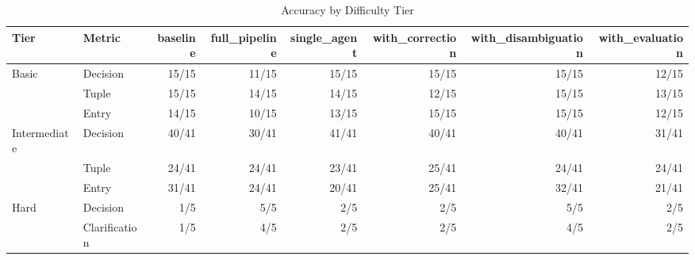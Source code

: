 \begin{table}[htbp]
\centering
\caption{Accuracy by Difficulty Tier}
\label{tab:tier-breakdown}
\begin{tabular}{ll rrrrrr}
\toprule
Tier & Metric & baseline & full\_pipeline & single\_agent & with\_correction & with\_disambiguation & with\_evaluation \\
\midrule
  Basic & Decision & 15/15 & 11/15 & 15/15 & 15/15 & 15/15 & 12/15 \\
   & Tuple & 15/15 & 14/15 & 14/15 & 12/15 & 15/15 & 13/15 \\
   & Entry & 14/15 & 10/15 & 13/15 & 15/15 & 15/15 & 12/15 \\
  \midrule
  Intermediate & Decision & 40/41 & 30/41 & 41/41 & 40/41 & 40/41 & 31/41 \\
   & Tuple & 24/41 & 24/41 & 23/41 & 25/41 & 24/41 & 24/41 \\
   & Entry & 31/41 & 24/41 & 20/41 & 25/41 & 32/41 & 21/41 \\
  \midrule
  Hard & Decision & 1/5 & 5/5 & 2/5 & 2/5 & 5/5 & 2/5 \\
   & Clarification & 1/5 & 4/5 & 2/5 & 2/5 & 4/5 & 2/5 \\
\bottomrule
\end{tabular}
\end{table}
